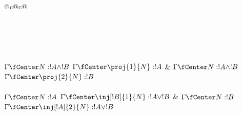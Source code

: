 \documentclass[../../../include/open-logic-section]{subfiles}
\begin{document}
\begin{table}
\begin{tabular}{@{}c@{}c@{}}
\\
\\[3ex]
\\[3ex]
\\[4ex]
\\[4ex]
\\[4ex]
\Axiom$\Gamma \fCenter N: !A \land !B$
\RightLabel{\Elim{\land}[1]}
\UnaryInf$\Gamma \fCenter \proj{1}{N} : !A$
\DisplayProof
&
\Axiom$\Gamma \fCenter N:!A \land !B$
\RightLabel{\Elim{\land}[2]}
\UnaryInf$\Gamma \fCenter \proj{2}{N} : !B$
\DisplayProof\\[3ex]
\\[4ex]
\Axiom$\Gamma \fCenter N: !A$
\RightLabel{\Intro{\lor}[1]}
\UnaryInf$\Gamma \fCenter \inj[!B]{1}{N} : !A \lor !B$
\DisplayProof
&
\Axiom$ \Gamma \fCenter N : !B$
\RightLabel{\Intro{\lor}[2]}
\UnaryInf$\Gamma \fCenter \inj[!A]{2}{N} : !A \lor !B$
\DisplayProof\\[3ex]
\\[4ex]
\end{tabular}
\caption{Aturan sistem dedhuksi alami intuisionistik proposisional
mawa label terma . Discharge diidinaké kosong kaya ing N2; binder kang ora dienggo dipilih seger.}
\end{table}
\end{document}
